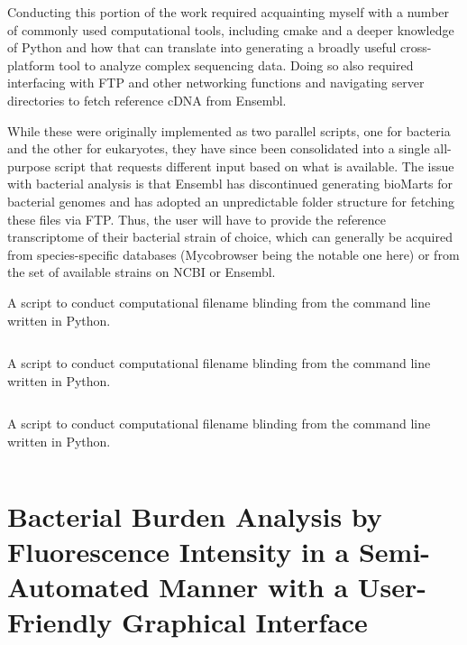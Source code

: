 Conducting this portion of the work required acquainting myself with a number of commonly used computational tools, including cmake and a deeper knowledge of Python and how that can translate into generating a broadly useful cross-platform tool to analyze complex sequencing data. Doing so also required interfacing with FTP and other networking functions and navigating server directories to fetch reference cDNA from Ensembl.

While these were originally implemented as two parallel scripts, one for bacteria and the other for eukaryotes, they have since been consolidated into a single all-purpose script that requests different input based on what is available. The issue with bacterial analysis is that Ensembl has discontinued generating bioMarts for bacterial genomes and has adopted an unpredictable folder structure for fetching these files via FTP. Thus, the user will have to provide the reference transcriptome of their bacterial strain of choice, which can generally be acquired from species-specific databases (Mycobrowser being the notable one here) or from the set of available strains on NCBI or Ensembl. 

\begin{code}
\caption{A script to conduct computational filename blinding from the command line written in Python.}
\label{blinder}

\inputminted[breaklines,frame=single]{python}{source/renamer.py}

\end{code}

\begin{code}
\caption{A script to conduct computational filename blinding from the command line written in Python.}
\label{blinder}

\inputminted[breaklines,frame=single]{python}{source/renamer.py}

\end{code}

\begin{code}
\caption{A script to conduct computational filename blinding from the command line written in Python.}
\label{blinder}

\inputminted[breaklines,frame=single]{python}{source/renamer.py}

\end{code}

\section{Bacterial Burden Analysis by Fluorescence Intensity in a Semi-Automated Manner with a User-Friendly Graphical Interface}


